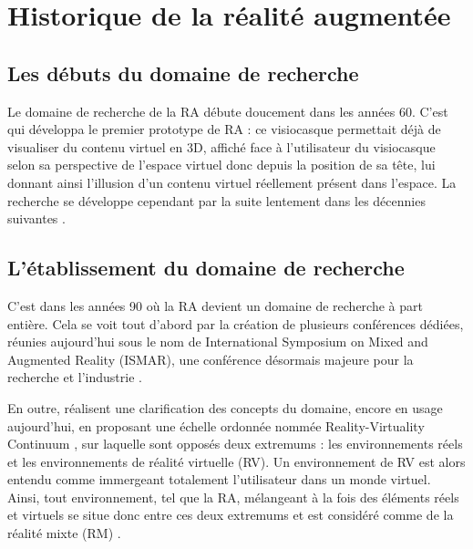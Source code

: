 \section{Historique de la réalité augmentée}
\subsection{Les débuts du domaine de recherche}

Le domaine de recherche de la RA débute doucement dans les années 60. C'est \citet{Sutherland1968} qui développa le premier prototype de RA : ce visiocasque permettait déjà de visualiser du contenu virtuel en 3D, affiché face à l'utilisateur du visiocasque selon sa perspective de l'espace virtuel donc depuis la position de sa tête, lui donnant ainsi l'illusion d'un contenu virtuel réellement présent dans l'espace. La recherche se développe cependant par la suite lentement dans les décennies suivantes \citep{VanKrevelenPoelman2010} \citep{CarmignianiFurhtAnisettiEtAl2011}.

\subsection{L'établissement du domaine de recherche}
C'est dans les années 90 où la RA devient un domaine de recherche à part entière. Cela se voit tout d'abord par la création de plusieurs conférences dédiées, réunies aujourd'hui sous le nom de International Symposium on Mixed and Augmented Reality (ISMAR), une conférence désormais majeure pour la recherche et l'industrie \citep{AzumaBaillotBehringerEtAl2001}.

En outre, \citet{MilgramKishino1994} réalisent une clarification des concepts du domaine, encore en usage aujourd'hui, en proposant une échelle ordonnée nommée \foreignlanguage{english}{Reality-Virtuality Continuum} , sur laquelle sont opposés deux extremums : les environnements réels et les environnements de réalité virtuelle (RV). Un environnement de RV est alors entendu comme immergeant totalement l'utilisateur dans un monde virtuel. Ainsi, tout environnement, tel que la RA, mélangeant à la fois des éléments réels et virtuels se situe donc entre ces deux extremums et est considéré comme de la réalité mixte (RM) \citep{MilgramKishino1994}.

